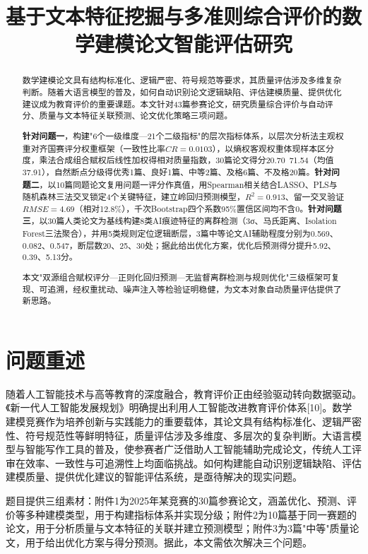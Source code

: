 \documentclass[withoutpreface]{cumcmthesis}
\title{基于文本特征挖掘与多准则综合评价的数学建模论文智能评估研究}
\begin{document}
\maketitle

\begin{abstract}
数学建模论文具有结构标准化、逻辑严密、符号规范等要求，其质量评估涉及多维复杂判断。随着大语言模型的普及，如何自动识别论文逻辑缺陷、评估建模质量、提供优化建议成为教育评价的重要课题。本文针对43篇参赛论文，研究质量综合评价与自动评分、质量与文本特征关联预测、论文优化策略三项问题。


\textbf{针对问题一}，构建"6个一级维度—21个二级指标"的层次指标体系，以层次分析法主观权重对齐国赛评分权重框架（一致性比率$CR=0.0103$），以熵权客观权重体现样本区分度，乘法合成组合赋权后线性加权得相对质量指数，30篇论文得分20.70~71.54（均值37.91），自然断点分级得优秀1篇、良好1篇、中等2篇、及格6篇、不及格20篇。\textbf{针对问题二}，以10篇同题论文复用问题一评分作真值，用Spearman相关结合LASSO、PLS与随机森林三法交叉锁定4个关键特征，建立岭回归预测模型，$R^2=0.913$、留一交叉验证$RMSE=4.69$（相对12.8\%），千次Bootstrap四个系数95\%置信区间均不含0。\textbf{针对问题三}，以30篇人类论文为基线构建8类AI痕迹特征的离群检测（3σ、马氏距离、Isolation Forest三法聚合），并用5类规则定位逻辑断层，3篇中等论文AI辅助程度分别为0.569、0.082、0.547，断层数20、25、30处；据此给出优化方案，优化后预测得分提升5.92、0.39、5.13分。


本文"双源组合赋权评分—正则化回归预测—无监督离群检测与规则优化"三级框架可复现、可追溯，经权重扰动、噪声注入等检验证明稳健，为文本对象自动质量评估提供了新思路。


\end{abstract}

\section{问题重述}
随着人工智能技术与高等教育的深度融合，教育评价正由经验驱动转向数据驱动。《新一代人工智能发展规划》明确提出利用人工智能改进教育评价体系[10]。数学建模竞赛作为培养创新与实践能力的重要载体，其论文具有结构标准化、逻辑严密性、符号规范性等鲜明特征，质量评估涉及多维度、多层次的复杂判断。大语言模型与智能写作工具的普及，使参赛者广泛借助人工智能辅助完成论文，传统人工评审在效率、一致性与可追溯性上均面临挑战。如何构建能自动识别逻辑缺陷、评估建模质量、提供优化建议的智能评估系统，是亟待解决的现实问题。

题目提供三组素材：附件1为2025年某竞赛的30篇参赛论文，涵盖优化、预测、评价等多种建模类型，用于构建指标体系并实现分级；附件2为10篇基于同一赛题的论文，用于分析质量与文本特征的关联并建立预测模型；附件3为3篇"中等"质量论文，用于给出优化方案与得分预测。据此，本文需依次解决三个问题。
\end{document}
